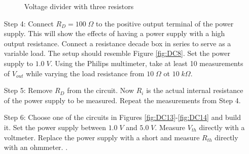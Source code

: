 \begin{itemize}[leftmargin = 50pt]
\begin{figure}[H]
    \caption{Voltage divider with three resistors}
    \label{fig:DC12}
\end{figure}
    \item[Step 4:] Connect $R_D = 100\;\Omega$ to the positive output terminal of the power supply. This will show the effects of having a power supply with a high output resistance. Connect a resistance decade box in series to serve as a variable load. The setup should resemble Figure \ref{fig:DC8}. Set the power supply to $1.0\;V$. Using the Philips multimeter, take at least 10 measurements of $V_{out}$ while varying the load resistance from $10\;\Omega$ ot $10\;k\Omega$.
    \item[Step 5:] Remove $R_D$ from the circuit. Now $R_i$ is the actual internal resistance of the power supply to be measured. Repeat the measurements from Step 4.
    \item[Step 6:] Choose one of the circuits in Figures \ref{fig:DC13}-\ref{fig:DC14} and build it. Set the power supply between $1.0\;V$ and $5.0\;V$. Measure $V_{th}$ directly with a voltmeter. Replace the power supply with a short and measure $R_{th}$ directly with an ohmmeter. .


\end{itemize}
